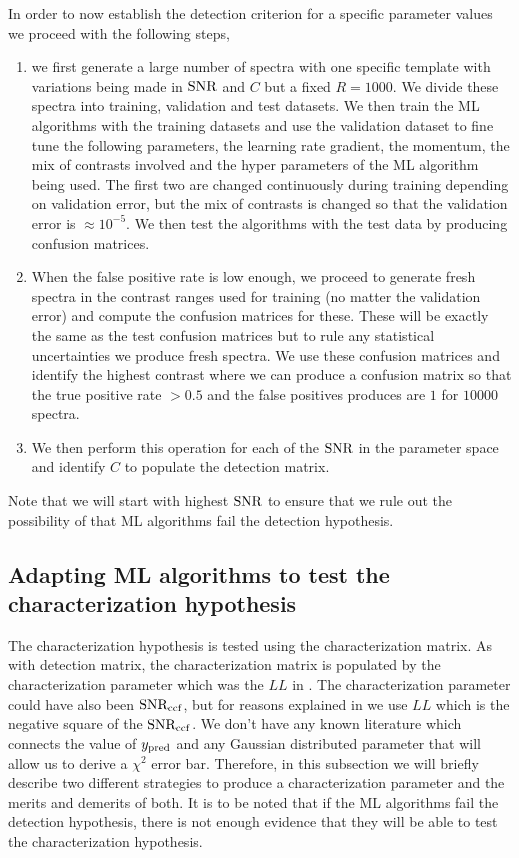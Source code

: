 In order to now establish the detection criterion for a specific parameter values we proceed with the following steps,
\begin{enumerate}
    \item we first generate a large number of spectra with one specific template with variations being made in $\rm{SNR}$ and $C$ but a fixed $R=1000$. We divide these spectra into training, validation and test datasets.
    We then train the ML algorithms with the training  datasets and use the validation dataset to fine tune the following parameters, the learning rate gradient, the momentum, the mix of contrasts involved and the hyper parameters of the ML algorithm being used.
    The first two are changed continuously during training depending on validation error, but the mix of contrasts is changed so that the validation error is $\approx 10^{-5}$.
    We then test the algorithms with the test data by producing confusion matrices.
    \item When the false positive rate is low enough, we proceed to generate fresh spectra in the contrast ranges used for training (no matter the validation error) and compute the confusion matrices for these. 
    These will be exactly the same as the test confusion matrices but to rule any statistical uncertainties we produce fresh spectra.
    We use these confusion matrices and identify the highest contrast where we can produce a confusion matrix so that the true positive rate $>0.5$ and the false positives produces are $1$ for $10000$ spectra.
    \item We then perform this operation for each of the $\rm{SNR}$ in the parameter space and identify $C$ to populate the detection matrix.
\end{enumerate}
Note that we will start with highest $\rm{SNR}$ to ensure that we rule out the possibility of that ML algorithms fail the detection hypothesis.
\subsection{Adapting ML algorithms to test the characterization hypothesis}
The characterization hypothesis is tested using the characterization matrix.
As with detection matrix, the characterization matrix is populated by the characterization parameter which was the $LL$ in .
The characterization parameter could have also been $\rm{SNR_{ccf}}$, but for reasons explained in  we use $LL$ which is the negative square of the $\rm{SNR_{ccf}}$.
We don't have any known literature which connects the value of $y_{\rm{pred}}$ and any Gaussian distributed parameter that will allow us to derive a $\chi^{2}$ error bar.
Therefore, in this subsection we will briefly describe two different strategies to produce a characterization parameter and the merits and demerits of both. 
It is to be noted that if the ML algorithms fail the detection hypothesis, there is not enough evidence that they will be able to test the characterization hypothesis.

